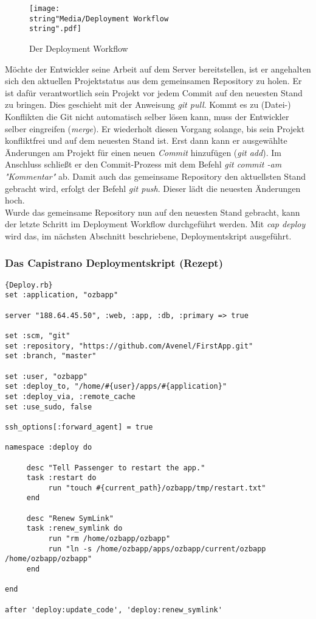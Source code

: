 \documentclass[12pt,             %
               a4paper,          %
               listof=totoc,     %
               index=totoc,      %
               bibliography=totoc,%
               oneside,         %
               BCOR1cm,          %
               english   %
               ]{scrbook}
\begin{document}
\begin{figure}[H]
     \begin{center}
          \texttt{[image: \\string"Media/Deployment Workflow\\string".pdf]}
     \end{center}
     \caption{Der Deployment Workflow}
     \label{fig:deployment_workflow}
\end{figure} 

Möchte der Entwickler seine Arbeit auf dem Server bereitstellen, ist er angehalten sich den aktuellen Projektstatus aus dem gemeinsamen Repository zu holen. Er ist dafür verantwortlich sein Projekt vor jedem Commit auf den neuesten Stand zu bringen. Dies geschieht mit der Anweisung \textit{git pull}. Kommt es zu (Datei-) Konflikten die Git nicht automatisch selber lösen kann, muss der Entwickler selber eingreifen (\textit{merge}). Er wiederholt diesen Vorgang solange, bis sein Projekt konfliktfrei und auf dem neuesten Stand ist. Erst dann kann er ausgewählte Änderungen am Projekt für einen neuen \textit{Commit} hinzufügen (\textit{git add}). Im Anschluss schließt er den Commit-Prozess mit dem Befehl \textit{git commit -am "Kommentar"} ab. Damit auch das gemeinsame Repository den aktuellsten Stand gebracht wird, erfolgt der Befehl \textit{git push}. Dieser lädt die neuesten Änderungen hoch.\\

Wurde das gemeinsame Repository nun auf den neuesten Stand gebracht, kann der letzte Schritt im Deployment Workflow durchgeführt werden. Mit \textit{cap deploy} wird das, im nächsten Abschnitt beschriebene, Deploymentskript ausgeführt. 

\subsubsection{Das Capistrano Deploymentskript (Rezept)}\label{subsec:deployment_recipe}

\begin{lstlisting}[frame=single, caption=Capistranot Deployment Rezept, tabsize=2, flexiblecolumns=true, captionpos=b]{Deploy.rb}
set :application, "ozbapp"

server "188.64.45.50", :web, :app, :db, :primary => true

set :scm, "git"
set :repository, "https://github.com/Avenel/FirstApp.git"
set :branch, "master"

set :user, "ozbapp"
set :deploy_to, "/home/#{user}/apps/#{application}"
set :deploy_via, :remote_cache
set :use_sudo, false

ssh_options[:forward_agent] = true

namespace :deploy do

     desc "Tell Passenger to restart the app."
     task :restart do
          run "touch #{current_path}/ozbapp/tmp/restart.txt"
     end

     desc "Renew SymLink"
     task :renew_symlink do
          run "rm /home/ozbapp/ozbapp"
          run "ln -s /home/ozbapp/apps/ozbapp/current/ozbapp /home/ozbapp/ozbapp"
     end

end

after 'deploy:update_code', 'deploy:renew_symlink'
\end{lstlisting}
\end{document}
